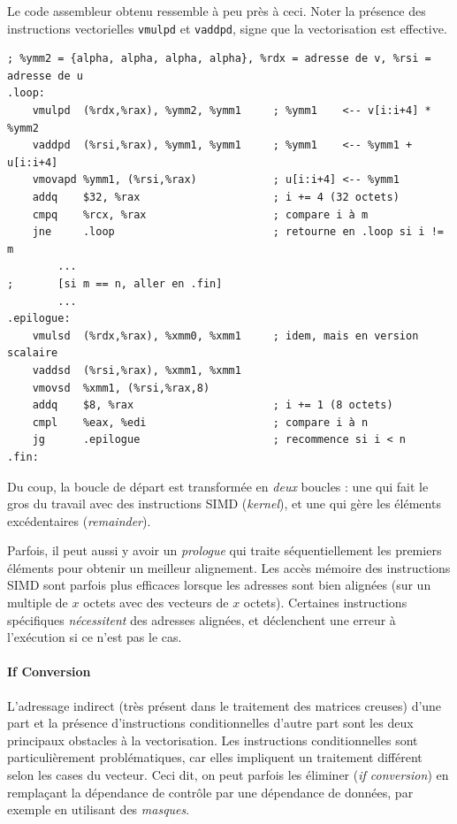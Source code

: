 \begin{danger}
  Le code assembleur obtenu ressemble à peu près à ceci. Noter la présence des
  instructions vectorielles \texttt{vmulpd} et \texttt{vaddpd}, signe que la
  vectorisation est effective.
  \begin{myfilet}
\begin{verbatim}
; %ymm2 = {alpha, alpha, alpha, alpha}, %rdx = adresse de v, %rsi = adresse de u 
.loop:
	vmulpd  (%rdx,%rax), %ymm2, %ymm1     ; %ymm1    <-- v[i:i+4] * %ymm2
	vaddpd  (%rsi,%rax), %ymm1, %ymm1     ; %ymm1    <-- %ymm1 + u[i:i+4]
	vmovapd %ymm1, (%rsi,%rax)            ; u[i:i+4] <-- %ymm1
	addq    $32, %rax                     ; i += 4 (32 octets)
	cmpq    %rcx, %rax                    ; compare i à m
	jne     .loop                         ; retourne en .loop si i != m
        ...
;       [si m == n, aller en .fin]
        ...
.epilogue:
	vmulsd  (%rdx,%rax), %xmm0, %xmm1     ; idem, mais en version scalaire
	vaddsd  (%rsi,%rax), %xmm1, %xmm1
	vmovsd  %xmm1, (%rsi,%rax,8)
	addq    $8, %rax                      ; i += 1 (8 octets)
	cmpl    %eax, %edi                    ; compare i à n
	jg      .epilogue                     ; recommence si i < n
.fin:
\end{verbatim}
  \end{myfilet}
\end{danger}

Du coup, la boucle de départ est transformée en \emph{deux} boucles : une qui
fait le gros du travail avec des instructions SIMD (\og \emph{kernel}\fg), et
une qui gère les éléments excédentaires (\og \emph{remainder}\fg).
\begin{danger}
  Parfois, il peut aussi y avoir un \emph{prologue} qui traite séquentiellement
  les premiers éléments pour obtenir un meilleur alignement. Les accès mémoire
  des instructions SIMD sont parfois plus efficaces lorsque les adresses sont
  bien alignées (sur un multiple de $x$ octets avec des vecteurs de $x$ octets).
  Certaines instructions spécifiques \emph{nécessitent} des adresses alignées,
  et déclenchent une erreur à l'exécution si ce n'est pas le cas.
\end{danger}

\paragraph{If Conversion}

L'adressage indirect (très présent dans le traitement des matrices creuses)
d'une part et la présence d'instructions conditionnelles d'autre part sont les
deux principaux obstacles à la vectorisation. Les instructions conditionnelles
sont particulièrement problématiques, car elles impliquent un traitement
différent selon les cases du vecteur. Ceci dit, on peut parfois les éliminer
(\og \emph{if conversion}\fg) en remplaçant la dépendance de contrôle par une
dépendance de données, par exemple en utilisant des \emph{masques}.

